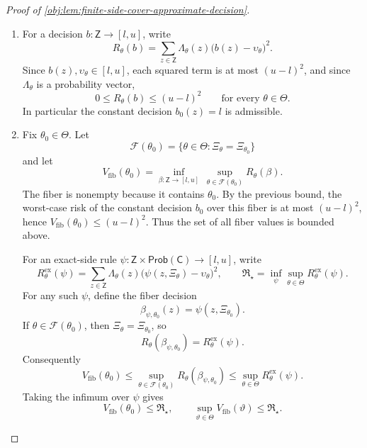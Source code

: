 \documentclass[11pt]{article}
\begin{document}
\begin{proof}[Proof of \cref{obj:lem:finite-side-cover-approximate-decision}]
\begin{enumerate}
\item For a decision \(b:\mathsf Z\to[l,u]\), write
\[
R_\theta(b)
=
\sum_{z\in\mathsf Z}\Lambda_\theta(z)\bigl(b(z)-\upsilon_\theta\bigr)^2 .
\]
Since \(b(z),\upsilon_\theta\in[l,u]\), each squared term is at most \((u-l)^2\), and since \(\Lambda_\theta\) is a probability vector,
\[
0\le R_\theta(b)\le (u-l)^2
\qquad\text{for every }\theta\in\Theta .
\]
In particular the constant decision \(b_0(z)=l\) is admissible. %

\item Fix \(\theta_0\in\Theta\). Let
\[
\mathcal F(\theta_0)
=
\{\theta\in\Theta:\Xi_\theta=\Xi_{\theta_0}\}
\]
and let
\[
V_{\mathrm{fib}}(\theta_0)
=
\inf_{\beta:\mathsf Z\to[l,u]}\ \sup_{\theta\in\mathcal F(\theta_0)} R_\theta(\beta).
\]
The fiber is nonempty because it contains \(\theta_0\). By the previous bound, the worst-case risk of the constant decision \(b_0\) over this fiber is at most \((u-l)^2\), hence \(V_{\mathrm{fib}}(\theta_0)\le (u-l)^2\). Thus the set of all fiber values is bounded above.

For an exact-side rule \(\psi:\mathsf Z\times\mathsf{Prob}(\mathsf C)\to[l,u]\), write
\[
R^{\mathrm{ex}}_\theta(\psi)
=
\sum_{z\in\mathsf Z}\Lambda_\theta(z)
\bigl(\psi(z,\Xi_\theta)-\upsilon_\theta\bigr)^2,
\qquad
\mathfrak R_\star
=
\inf_\psi\sup_{\theta\in\Theta}R^{\mathrm{ex}}_\theta(\psi).
\]
For any such \(\psi\), define the fiber decision
\[
\beta_{\psi,\theta_0}(z)=\psi(z,\Xi_{\theta_0}).
\]
If \(\theta\in\mathcal F(\theta_0)\), then \(\Xi_\theta=\Xi_{\theta_0}\), so
\[
R_\theta(\beta_{\psi,\theta_0})=R^{\mathrm{ex}}_\theta(\psi).
\]
Consequently
\[
V_{\mathrm{fib}}(\theta_0)
\le
\sup_{\theta\in\mathcal F(\theta_0)}R_\theta(\beta_{\psi,\theta_0})
\le
\sup_{\theta\in\Theta}R^{\mathrm{ex}}_\theta(\psi).
\]
Taking the infimum over \(\psi\) gives
\[
V_{\mathrm{fib}}(\theta_0)\le \mathfrak R_\star,
\qquad
\sup_{\vartheta\in\Theta}V_{\mathrm{fib}}(\vartheta)\le \mathfrak R_\star.
\]


\end{enumerate}
\end{proof}
\end{document}
